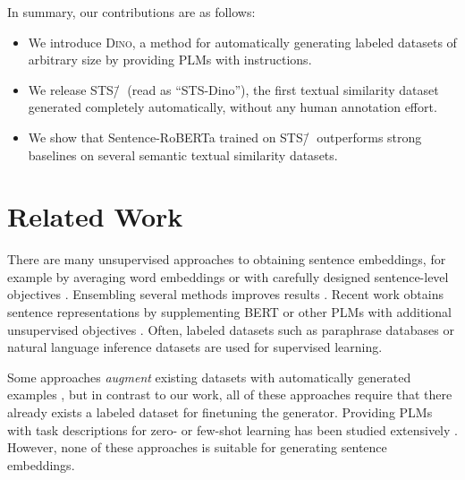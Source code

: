 \documentclass[11pt]{article}
\newcommand\ours{\textsc{Dino}}
\newcommand\ourDs{STS\=/🦕}
\begin{document}
In summary, our contributions are as follows:
\begin{itemize} 
\item We introduce \ours{}, a method for automatically generating labeled datasets of arbitrary size by providing PLMs with instructions.
\item We release \ourDs{} (read as ``STS-Dino''), the
first textual similarity dataset generated
completely automatically,
without any human annotation effort.
\item We show that Sentence-RoBERTa \citep{reimers-gurevych-2019-sentence} trained on \ourDs{} outperforms strong baselines on several semantic textual similarity datasets.
\end{itemize}

\section{Related Work}

There are many unsupervised approaches to obtaining sentence
embeddings, for example by averaging word
embeddings \citep{mikolov2013word2vec,Glove,bojanowski2017enriching}
or with carefully designed sentence-level
objectives \citep{pmlr-v32-le14,NIPS2015_f442d33f}.
Ensembling several methods improves results
\citep{porner19domainadapt,porner20meta}.
Recent work obtains sentence representations by supplementing BERT \citep{devlin2018bert} or other PLMs with additional unsupervised objectives \citep{zhang-etal-2020-unsupervised,li-etal-2020-sentence,wu2020clear,giorgi2020declutr}. Often, labeled datasets such as paraphrase databases \citep{wieting-gimpel-2018-paranmt} or natural language inference datasets \citep{conneau-etal-2017-supervised,cer-etal-2018-universal,reimers-gurevych-2019-sentence} are used for supervised learning.

Some approaches \emph{augment} existing datasets with
automatically generated
examples \citep{Anaby-Tavor_Carmeli_Goldbraich_Kantor_Kour_Shlomov_Tepper_Zwerdling_2020,papanikolaou2020dare,yang-etal-2020-generative,mohapatra2020simulated,kumar2021data},
but in contrast to our work, all of these approaches require
that there already exists a labeled dataset for finetuning the generator.
Providing PLMs with task descriptions for zero- or few-shot learning has been studied extensively \citep[e.g.,][]{radford2018language,puri2019zeroshot,brown2020language,schick2020fewshot,schick2020just,schick2020exploiting,Weller_2020,gao2020making,tam2021improving}. However, none of these approaches is suitable for generating sentence embeddings.
\end{document}
